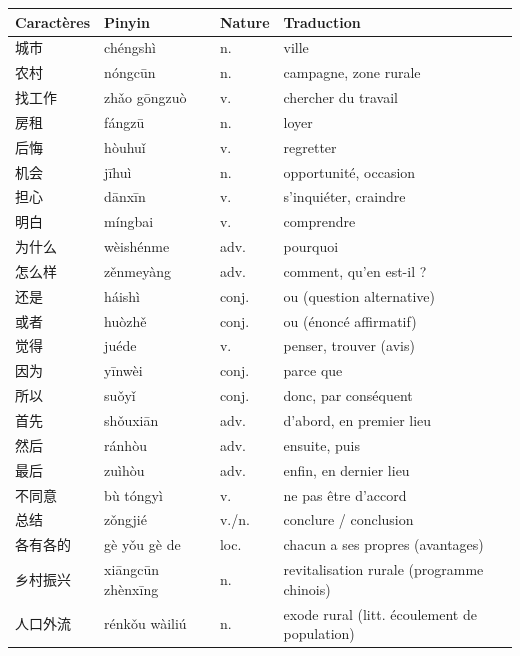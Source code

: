 \documentclass[11pt]{article}
\begin{document}
\begin{center}
\begin{tabularx}{\linewidth}{|X|X|X|X|}
\hline
\rowcolor{popblueL} Caractères & Pinyin & Nature & Traduction \\
\hline
城市 & chéngshì & n. & ville \\
\hline
农村 & nóngcūn & n. & campagne, zone rurale \\
\hline
找工作 & zhǎo gōngzuò & v. & chercher du travail \\
\hline
房租 & fángzū & n. & loyer \\
\hline
后悔 & hòuhuǐ & v. & regretter \\
\hline
机会 & jīhuì & n. & opportunité, occasion \\
\hline
担心 & dānxīn & v. & s'inquiéter, craindre \\
\hline
明白 & míngbai & v. & comprendre \\
\hline
为什么 & wèishénme & adv. & pourquoi \\
\hline
怎么样 & zěnmeyàng & adv. & comment, qu'en est-il ? \\
\hline
还是 & háishì & conj. & ou (question alternative) \\
\hline
或者 & huòzhě & conj. & ou (énoncé affirmatif) \\
\hline
觉得 & juéde & v. & penser, trouver (avis) \\
\hline
因为 & yīnwèi & conj. & parce que \\
\hline
所以 & suǒyǐ & conj. & donc, par conséquent \\
\hline
首先 & shǒuxiān & adv. & d'abord, en premier lieu \\
\hline
然后 & ránhòu & adv. & ensuite, puis \\
\hline
最后 & zuìhòu & adv. & enfin, en dernier lieu \\
\hline
不同意 & bù tóngyì & v. & ne pas être d'accord \\
\hline
总结 & zǒngjié & v./n. & conclure / conclusion \\
\hline
各有各的 & gè yǒu gè de & loc. & chacun a ses propres (avantages) \\
\hline
乡村振兴 & xiāngcūn zhènxīng & n. & revitalisation rurale (programme chinois) \\
\hline
人口外流 & rénkǒu wàiliú & n. & exode rural (litt. écoulement de population) \\
\hline
\end{tabularx}
\end{center}
\end{document}
